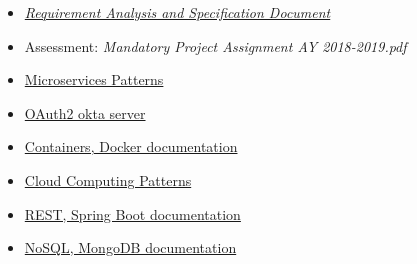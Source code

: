 \begin{itemize}
    \item \href{https://github.com/AlviseDeFaveri/BiscontiniDeFaveriGelli/blob/master/DeliveryFolder/RASD1.pdf}{\textit{Requirement Analysis and Specification Document}}
    \item Assessment: \textit{Mandatory Project Assignment AY 2018-2019.pdf}
    \item \href{https://microservices.io/patterns/microservices.html}{Microservices Patterns}
    \item \href{https://developer.okta.com/}{OAuth2 okta server}
    \item \href{https://docs.docker.com/}{Containers, Docker documentation}
    \item \href{http://www.cloudcomputingpatterns.org}{Cloud Computing Patterns}
    \item \href{https://spring.io/guides/gs/spring-boot/}{REST, Spring Boot documentation}
    \item \href{https://docs.mongodb.com/manual/?_ga=2.123884815.463355926.1544465476-1266243316.1544465476}{NoSQL, MongoDB documentation}
\end{itemize}